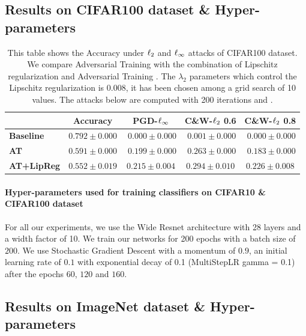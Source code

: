 \subsection{Results on CIFAR100 dataset \& Hyper-parameters}

\begin{table}[htb]
  \centering
  \caption{This table shows the Accuracy under $\ell_2$ and $\ell_\infty$ attacks of CIFAR100 dataset. We compare Adversarial Training with the combination of Lipschitz regularization and Adversarial Training \cite{madry2018towards}. The $\lambda_2$ parameters which control the Lipschitz regularization is $0.008$, it has been chosen among a grid search of 10 values. The attacks below are computed with 200 iterations and . }
    \begin{tabular}{lcccc}
    \toprule
      & \textbf{Accuracy} & \textbf{PGD-$\ell_\infty$} & \textbf{C\&W-$\ell_2$ 0.6} & \textbf{C\&W-$\ell_2$ 0.8} \\
    \midrule
    \textbf{Baseline} & $\mathbf{0.792}\pm0.000$ & $\phantom{.}0.000\pm0.000$ & $\phantom{.}0.001\pm0.000$ & $\phantom{.}0.000\pm0.000$ \\
    \textbf{AT} & \phantom{.}$0.591\pm0.000$ & $\phantom{.}0.199\pm0.000$ & $\phantom{.}0.263\pm0.000$ & $\phantom{.}0.183\pm0.000$ \\
    \textbf{AT+LipReg} & \phantom{.}$0.552\pm0.019$ & $\mathbf{0.215}\pm0.004$ & $\mathbf{0.294}\pm0.010$ & $\mathbf{0.226}\pm0.008$ \\
    \bottomrule
    \end{tabular}%
  \label{tab:results_cifar100}%
\end{table}%


\paragraph{Hyper-parameters used for training classifiers on CIFAR10 \& CIFAR100 dataset}
For all our experiments, we use the Wide Resnet architecture \cite{zagoruyko2016wide} with 28 layers and a width factor of 10. We train our networks for 200 epochs with a batch size of $200$. We use Stochastic Gradient Descent with a momentum of $0.9$, an initial learning rate of $0.1$ with exponential decay of 0.1 (MultiStepLR gamma = 0.1) after the epochs $60$, $120$ and $160$. 

\subsection{Results on ImageNet dataset \& Hyper-parameters}

